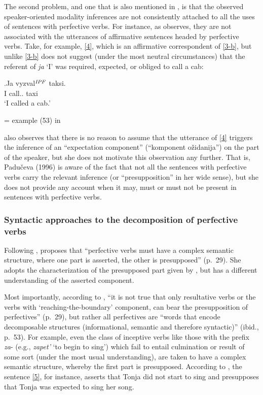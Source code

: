 The second problem, and one that is also mentioned in \citealt{Gronn:04}, is that the observed speaker-oriented modality inferences are not consistently attached to all the uses of sentences with perfective verbs. For instance, as \citet{Gronn:04} observes, they are not associated with the utterances of affirmative sentences headed by perfective verbs. Take, for example, \ref{4}, which is an affirmative correspondent of \ref{3-b}, but unlike \ref{3-b} does not suggest (under the most neutral circumstances) that the referent of \textit{ja} `I' was required, expected, or obliged to call a cab:

\exg.\label{4}Ja vyzval$^{\mathit{IPF}}$ taksi.\\
 I call.. taxi\\
 \vspace{0.5em}
 `I called a cab.'
 \begin{flushright}
\vspace{-0.5em}
 = example (53) in \citealt[61]{Gronn:04}
 \end{flushright}
 
\citet[56]{Paducheva:96} also observes that there is no reason to assume that the utterance of \ref{4} triggers the inference of an ``expectation component'' (``komponent o\v{z}idanija'') on the part of the speaker, but she does not motivate this observation any further. That is, Padu\v{c}eva (1996) is aware of the fact that not all the sentences with perfective verbs carry the relevant inference (or ``presupposition'' in her wide sense), but she does not provide any account when it may, must or must not be present in sentences with perfective verbs. 
 
\subsubsection{Syntactic approaches to the decomposition of perfective verbs}
Following \citet{Paducheva:96}, \citet{Romanova:06} proposes that ``perfective verbs must have a complex semantic structure, where one part is asserted, the other is presupposed'' (p.~29). She adopts the characterization of the presupposed part given by \citet{Paducheva:96}, but has a different understanding of the asserted component. 

 Most importantly, according to \citet{Romanova:06}, ``it is not true that only resultative verbs or the verbs with `reaching-the-boundary' component, can bear the presupposition of perfectives'' (p.~29), but rather all perfectives are ``words that encode decomposable structures (informational, semantic and therefore syntactic)'' (ibid., p.~53). For example, even the class of inceptive verbs like those with the prefix \textit{za}-  (e.g., \textit{zapet'} `to begin to sing') which fail to entail culmination or result of some sort (under the most usual understanding), are taken to have a complex semantic structure, whereby the first part is presupposed. According to \citet{Romanova:06}, the sentence \ref{5}, for instance, asserts that Tonja did not start to sing and presupposes that Tonja was expected to sing her song.
 
